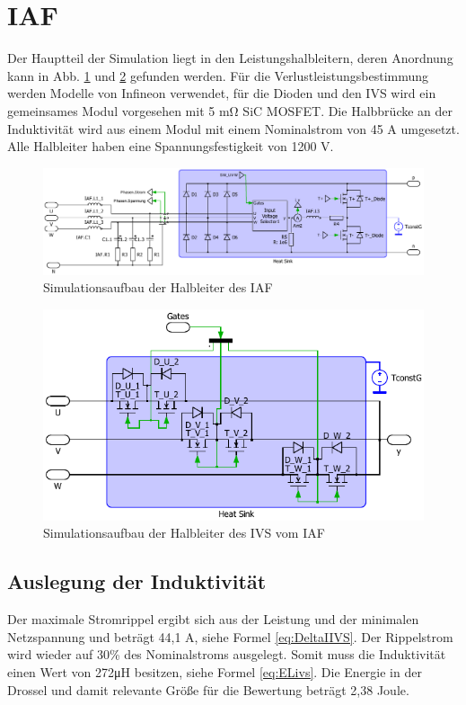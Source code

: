 \section{IAF}
	Der Hauptteil der Simulation liegt in den Leistungshalbleitern, deren Anordnung kann in Abb. \ref{fig:iafplecsmain} und \ref{fig:iafplecsivs} gefunden werden. Für die Verlustleistungsbestimmung werden Modelle von Infineon verwendet, für die Dioden und den \gls{IVS} wird ein gemeinsames Modul vorgesehen mit 5 \si{\milli \ohm} \gls{SiC} \gls{MOSFET}. Die Halbbrücke an der Induktivität wird aus einem Modul mit einem Nominalstrom von 45 A umgesetzt. Alle Halbleiter haben eine Spannungsfestigkeit von 1200 V.
	\begin{figure}
		\centering
		\includegraphics[width=1\linewidth]{content/Grafiken/IAF_Plecs_main}
		\caption{Simulationsaufbau der Halbleiter des IAF}
		\label{fig:iafplecsmain}
	\end{figure}
	\begin{figure}
		\centering
		\includegraphics[width=0.9\linewidth]{content/Grafiken/IAF_Plecs_IVS}
		\caption{Simulationsaufbau der Halbleiter des IVS vom IAF}
		\label{fig:iafplecsivs}
	\end{figure}
	
	\cite{IAF99}
	
	\subsection{Auslegung der Induktivität}
	Der maximale Stromrippel ergibt sich aus der Leistung und der minimalen Netzspannung und beträgt 44,1 \si{\A}, siehe Formel \ref{eq:DeltaIIVS}. Der Rippelstrom wird wieder auf 30\% des Nominalstroms ausgelegt. Somit muss die Induktivität einen Wert von 272\si{\micro \henry} besitzen, siehe Formel \ref{eq:ELivs}. Die Energie in der Drossel und damit relevante Größe für die Bewertung beträgt 2,38 Joule. 
	
